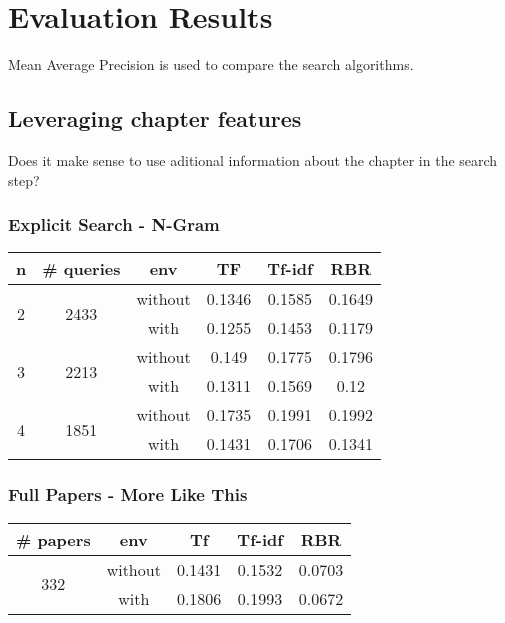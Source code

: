 \chapter{Evaluation Results}
\label{cha:evaluation-results}
Mean Average Precision is used to compare the search algorithms.


\section{Leveraging chapter features}
Does it make sense to use aditional information about the chapter in the search step?
\subsection{Explicit Search - N-Gram}
\begin{center}
  \begin{tabular}{ | c | c | c | c | c | c | }
    \hline
    \rowcolor{lightblue}
    \textbf{n} & \textbf{\# queries} & \textbf{env} & \textbf{TF} & \textbf{Tf-idf} & \textbf{RBR} \\ \hline
    \multirow{2}{*}{2} & \multirow{2}{*}{2433} & without & 0.1346 & 0.1585 & 0.1649 \\ \cline{3-6}
                                              && with    & 0.1255 & 0.1453 & 0.1179 \\ \hline \hline
    \multirow{2}{*}{3} & \multirow{2}{*}{2213} & without & 0.149  & 0.1775 & 0.1796 \\ \cline{3-6}
                                              && with    & 0.1311 & 0.1569 & 0.12   \\ \hline \hline
    \multirow{2}{*}{4} & \multirow{2}{*}{1851} & without & 0.1735 & 0.1991 & 0.1992 \\ \cline{3-6}
                                              && with    & 0.1431 & 0.1706 & 0.1341 \\ \hline
  \end{tabular}
\end{center}


\subsection{Full Papers - More Like This}
\begin{center}
  \begin{tabular}{ | c | c | c | c | c | }
    \hline
    \rowcolor{lightblue}
    \textbf{\# papers} & \textbf{env} & \textbf{Tf} & \textbf{Tf-idf} & \textbf{RBR} \\ \hline
    \multirow{2}{*}{332} & without & 0.1431 & 0.1532 & 0.0703 \\ \cline{2-5}
                         & with   & 0.1806 & 0.1993 & 0.0672 \\ \hline
  \end{tabular}
\end{center}


